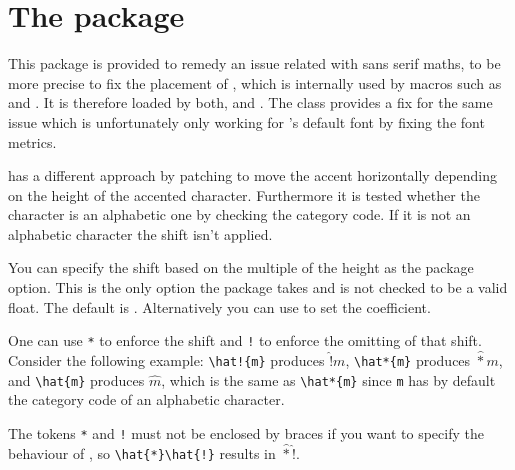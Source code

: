 \chapter{The  package}
This package is provided to remedy an issue related with sans serif maths, to be
more precise to fix the placement of , which is internally used
by macros such as  and . It is therefore loaded by both,
 and . The  class provides a fix for the
same issue which is unfortunately only working for 's default font
by fixing the font metrics.

 has a different approach by patching  to move the
accent horizontally depending on the height of the accented character.
Furthermore it is tested whether the character is an alphabetic one by checking
the category code. If it is not an alphabetic character the shift isn't applied.

You can specify the shift based on the multiple of the height as the package
option. This is the only option the package takes and is not checked to be a
valid float. The default is \makeatletter\texttt{\MRTsfacc@shift}\makeatother.
Alternatively you can use  to set the coefficient.

One can use \texttt{*} to enforce the shift and \texttt{!} to enforce the
omitting of that shift. Consider the following example:
\verb$\hat!{m}$ produces $\hat!{m}$, \verb$\hat*{m}$ produces $\hat*{m}$, and
\verb$\hat{m}$ produces $\hat{m}$, which is the same as \verb$\hat*{m}$ since
\texttt{m} has by default the category code of an alphabetic character.

The tokens \texttt{*} and \texttt{!} must not be enclosed by braces if you want
to specify the behaviour of , so \verb$\hat{*}\hat{!}$ results
in $\hat{*}\hat{!}$.

